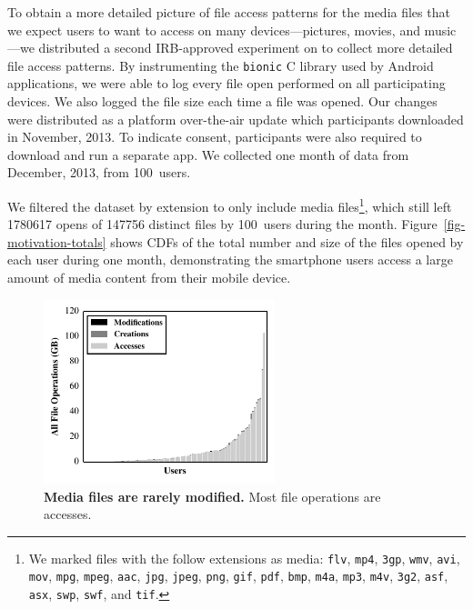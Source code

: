 To obtain a more detailed picture of file access patterns for the media files
that we expect users to want to access on many devices---pictures, movies,
and music---we distributed a second IRB-approved experiment on \PhoneLab{} to
collect more detailed file access patterns. By instrumenting the
\texttt{bionic} C library used by Android applications, we were able to log
every file open performed on all participating devices. We also logged the
file size each time a file was opened. Our changes were distributed as a
platform over-the-air update which \PhoneLab{} participants downloaded in
November, 2013. To indicate consent, participants were also required to
download and run a separate app. We collected one month of data from
December, 2013, from 100~users.

We filtered the dataset by extension to only include media files\footnote{We
marked files with the follow extensions as media: \texttt{flv}, \texttt{mp4},
\texttt{3gp}, \texttt{wmv}, \texttt{avi}, \texttt{mov}, \texttt{mpg},
\texttt{mpeg}, \texttt{aac}, \texttt{jpg}, \texttt{jpeg}, \texttt{png},
\texttt{gif}, \texttt{pdf}, \texttt{bmp}, \texttt{m4a}, \texttt{mp3},
\texttt{m4v}, \texttt{3g2}, \texttt{asf}, \texttt{asx}, \texttt{swp},
\texttt{swf}, and \texttt{tif}.}, which still left \num{1780617} opens of
\num{147756} distinct files by 100~users during the month.
Figure~\ref{fig-motivation-totals} shows CDFs of the total number and size of
the files opened by each \PhoneLab{} user during one month, demonstrating the
smartphone users access a large amount of media content from their mobile
device.

\begin{figure}

\vspace*{-0.2in}

\includegraphics[width=0.6\textwidth]{./figures/pocketlocker/OperationPercentageGraph.pdf}

\vspace*{-0.1in}

\caption{\small \textbf{Media files are rarely modified.} Most file
operations are accesses.}

\label{fig-motivation-modification}

\vspace*{-0.2in}

\end{figure}

